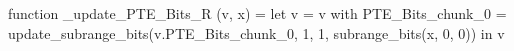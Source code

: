 function _update_PTE_Bits_R (v, x) = let v = { v with PTE_Bits_chunk_0 = update_subrange_bits(v.PTE_Bits_chunk_0, 1, 1, subrange_bits(x, 0, 0)) } in
  v
